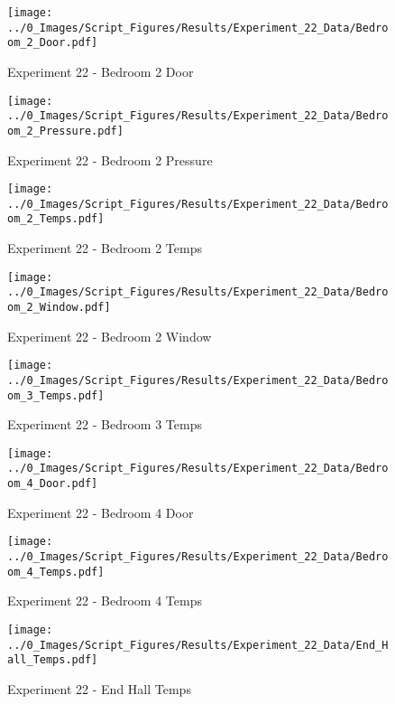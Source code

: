 	\begin{figure}[H]
		\centering
		\texttt{[image: ../0\_Images/Script\_Figures/Results/Experiment\_22\_Data/Bedroom\_2\_Door.pdf]}
		\caption[]{Experiment 22 - Bedroom 2 Door}
	\end{figure}
 
	\clearpage

	\begin{figure}[H]
		\centering
		\texttt{[image: ../0\_Images/Script\_Figures/Results/Experiment\_22\_Data/Bedroom\_2\_Pressure.pdf]}
		\caption[]{Experiment 22 - Bedroom 2 Pressure}
	\end{figure}
 

	\begin{figure}[H]
		\centering
		\texttt{[image: ../0\_Images/Script\_Figures/Results/Experiment\_22\_Data/Bedroom\_2\_Temps.pdf]}
		\caption[]{Experiment 22 - Bedroom 2 Temps}
	\end{figure}
 
	\clearpage

	\begin{figure}[H]
		\centering
		\texttt{[image: ../0\_Images/Script\_Figures/Results/Experiment\_22\_Data/Bedroom\_2\_Window.pdf]}
		\caption[]{Experiment 22 - Bedroom 2 Window}
	\end{figure}
 

	\begin{figure}[H]
		\centering
		\texttt{[image: ../0\_Images/Script\_Figures/Results/Experiment\_22\_Data/Bedroom\_3\_Temps.pdf]}
		\caption[]{Experiment 22 - Bedroom 3 Temps}
	\end{figure}
 
	\clearpage

	\begin{figure}[H]
		\centering
		\texttt{[image: ../0\_Images/Script\_Figures/Results/Experiment\_22\_Data/Bedroom\_4\_Door.pdf]}
		\caption[]{Experiment 22 - Bedroom 4 Door}
	\end{figure}
 

	\begin{figure}[H]
		\centering
		\texttt{[image: ../0\_Images/Script\_Figures/Results/Experiment\_22\_Data/Bedroom\_4\_Temps.pdf]}
		\caption[]{Experiment 22 - Bedroom 4 Temps}
	\end{figure}
 
	\clearpage

	\begin{figure}[H]
		\centering
		\texttt{[image: ../0\_Images/Script\_Figures/Results/Experiment\_22\_Data/End\_Hall\_Temps.pdf]}
		\caption[]{Experiment 22 - End Hall Temps}
	\end{figure}
 

